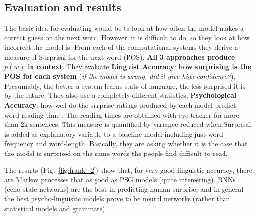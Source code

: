 \subsection{Evaluation and results}
The basic idea for evaluating would be to look at how often the model makes a correct guess on the next word. However, it is difficult to do, so they look at how incorrect the model is. 
From each of the computational systems they derive a measure of Surprisal for the next word (POS). \textbf{All 3 approaches produce $p(w)$ in context}. 
They evaluate \textbf{Linguist Accuracy}: \textbf{how surprising is the POS for each system} (\textit{if the model is wrong, did it give high confidence?}). Presumably, the better a system learns stats of language, the less surprised it is by the future.
They also use a completely different statistics, \textbf{Psychological Accuracy}: how well do the surprise ratings produced by each model predict word reading time \notet.
The reading times are obtained with eye tracker for more than 2k sentences. This measure is quantified by variance reduced when Surprisal is added as explanatory variable to a baseline model including just word-frequency and word-length. Basically, they are asking whether it is the case that the model is surprised on the same words the people find difficult to read.


The results (Fig.~\ref{fig:frank_2}) show that, for very good linguistic accuracy, there are Markov processes that as good as PSG models (quite interesting).
RNNs (echo state networks) are the best in predicting human surprise, and in general the best psycho-linguistic models prove to be neural networks (rather than statistical models and grammars).

